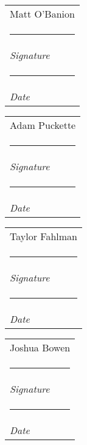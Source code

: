 \documentclass{article}
\makeatletter
\newcommand{\namesigdate}[2][5cm]{%
  \begin{tabular}{@{}p{#1}@{}}
    #2 \\[2\normalbaselineskip] \hrule \\[0pt]
    {\small \textit{Signature}} \\[2\normalbaselineskip] \hrule \\[0pt]
    {\small \textit{Date}}
  \end{tabular}
}
\makeatother
\begin{document}
\newpage
\vspace{2pc}

\noindent \namesigdate{Matt O'Banion} \hfill \namesigdate[3cm]{Adam Puckette}

\vspace{2pc}

\noindent \namesigdate{Taylor Fahlman} \hfill \namesigdate[3cm]{Joshua Bowen}
\end{document}
